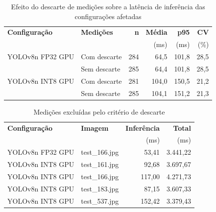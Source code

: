 \begin{table}[H]
\centering
\small
\caption{Efeito do descarte de medições sobre a latência de inferência
das configurações afetadas}
\label{tab:descartes}
\begin{tabular}{llrrrr}
\toprule
\textbf{Configuração} & \textbf{Medições} & \textbf{n} &
\textbf{Média} & \textbf{p95} & \textbf{CV} \\
 &  &  & (ms) & (ms) & (\%) \\
\midrule
YOLOv8n \ac{FP32} \ac{GPU} & Com descarte & 284 & 64,5 & 101,8 & 28,5 \\
 & Sem descarte & 285 & 64,4 & 101,8 & 28,5 \\
\midrule
YOLOv8n \ac{INT8} \ac{GPU} & Com descarte & 281 & 104,0 & 150,5 & 21,2 \\
 & Sem descarte & 285 & 104,1 & 151,2 & 21,3 \\
\bottomrule
\end{tabular}
\end{table}

\begin{table}[H]
\centering
\small
\caption{Medições excluídas pelo critério de descarte}
\label{tab:descartes_brutos}
\begin{tabular}{llrr}
\toprule
\textbf{Configuração} & \textbf{Imagem} & \textbf{Inferência} &
\textbf{Total} \\
 &  & (ms) & (ms) \\
\midrule
YOLOv8n \ac{FP32} \ac{GPU} & test\_166.jpg & 53,41 & 3.441,22 \\
YOLOv8n \ac{INT8} \ac{GPU} & test\_161.jpg & 92,68 & 3.697,67 \\
YOLOv8n \ac{INT8} \ac{GPU} & test\_166.jpg & 117,00 & 4.271,73 \\
YOLOv8n \ac{INT8} \ac{GPU} & test\_183.jpg & 87,15 & 3.607,33 \\
YOLOv8n \ac{INT8} \ac{GPU} & test\_537.jpg & 152,42 & 3.379,43 \\
\bottomrule
\end{tabular}
\end{table}
